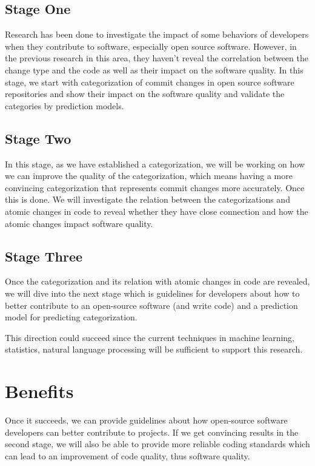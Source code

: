 \documentclass[10pt,conference]{IEEEtran}
\begin{document}
\subsection{Stage One}
Research has been done to investigate the impact of some behaviors of developers when they contribute to software, especially open source software. However, in the previous research in this area, they haven't reveal the correlation between the change type and the code as well as their impact on the software quality. In this stage, we start with categorization of commit changes in open source software repositories and show their impact on the software quality and validate the categories by prediction models.


\subsection{Stage Two}
In this stage, as we have established a categorization, we will be working on how we can improve the quality of the categorization, which means having a more convincing categorization that represents commit changes more accurately. Once this is done. We will investigate the relation between the categorizations and atomic changes in code to reveal whether they have close connection and how the atomic changes impact software quality.

\subsection{Stage Three}
Once the categorization and its relation with atomic changes in code are revealed, we will dive into the next stage which is guidelines for developers about how to better contribute to an open-source software (and write code) and a prediction model for predicting categorization.

This direction could succeed since the current techniques in machine learning, statistics, natural language processing will be sufficient to support this research. 

\section{Benefits}

Once it succeeds, we can provide guidelines about how open-source software developers can better contribute to projects. If we get convincing results in the second stage, we will also be able to provide more reliable coding standards which can lead to an improvement of code quality, thus software quality.
\end{document}
